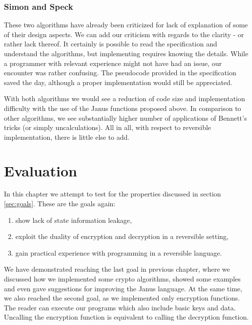 \documentclass[a4paper,10pt,openright]{memoir}
\begin{document}
\subsection{Simon and Speck}

These two algorithms have already been criticized for lack of 
explanation of some of their design aspects. We can add our criticism 
with regards to the clarity - or rather lack thereof. It certainly is 
possible to read the specification and understand the algorithms, but 
implementing requires knowing the details. While a programmer with 
relevant experience might not have had an issue, our encounter was 
rather confusing. The pseudocode provided in the specification saved 
the day, although a proper implementation would still be appreciated.

With both algorithms we would see a reduction of code size and 
implementation difficulty with the use of the Janus functions proposed 
above. In comparison to other algorithms, we see substantially higher 
number of applications of Bennett's tricks (or simply uncalculations). 
All in all, with respect to reversible implementation, there is little 
else to add. 


\chapter{Evaluation}
\label{sec:eval}

In this chapter we attempt to test for the properties discussed in 
section \ref{sec:goals}. These are the goals again:

\begin{enumerate}
\item show lack of state information leakage,
\item exploit the duality of encryption and decryption in a reversible setting,
\item gain practical experience with programming in a reversible language.
\end{enumerate}

We have demonstrated reaching the last goal in previous chapter, where 
we discussed how we implemented some crypto algorithms, showed some 
examples and even gave suggestions for improving the Janus language. At 
the same time, we also reached the second goal, as we implemented only 
encryption functions. The reader can execute our programs which also 
include basic keys and data. Uncalling the encryption function is 
equivalent to calling the decryption function.
\end{document}
